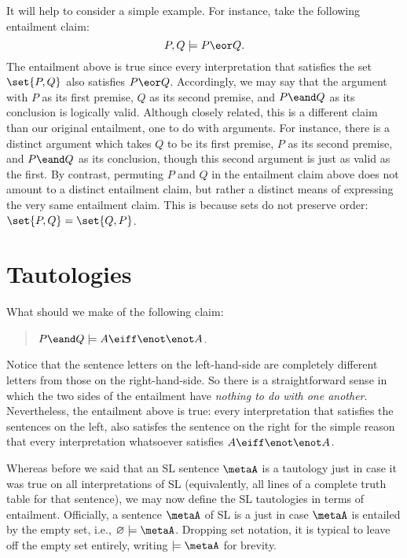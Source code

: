 It will help to consider a simple example.
For instance, take the following entailment claim: 
  $$P, Q \models P\eor Q.$$ 
The entailment above is true since every interpretation that satisfies the set $\set{P, Q}$ also satisfies $P\eor Q$.
Accordingly, we may say that the argument with $P$ as its first premise, $Q$ as its second premise, and $P\eand Q$ as its conclusion is logically valid. 
Although closely related, this is a different claim than our original entailment, one to do with arguments.
For instance, there is a distinct argument which takes $Q$ to be its first premise, $P$ as its second premise, and $P\eand Q$ as its conclusion, though this second argument is just as valid as the first.
By contrast, permuting $P$ and $Q$ in the entailment claim above does not amount to a distinct entailment claim, but rather a distinct means of expressing the very same entailment claim. 
This is because sets do not preserve order: $\set{P,Q}=\set{Q,P}$.




\section{Tautologies}

What should we make of the following claim:

\begin{quote}
  $P\eand Q \models A\eiff\enot\enot A$.
\end{quote}

Notice that the sentence letters on the left-hand-side are completely different letters from those on the right-hand-side.
So there is a straightforward sense in which the two sides of the entailment have \emph{nothing to do with one another}.
Nevertheless, the entailment above is true: every interpretation that satisfies the sentences on the left, also satisfes the sentence on the right for the simple reason that every interpretation whatsoever satisfies $A\eiff\enot\enot A$.

Whereas before we said that an SL sentence $\metaA$ is a tautology just in case it was true on all interpretations of SL (equivalently, all lines of a complete truth table for that sentence), we may now define the SL tautologies in terms of entailment.
Officially, a sentence $\metaA$ of SL is a  just in case $\metaA$ is entailed by the empty set, i.e., $\varnothing \models \metaA$.
Dropping set notation, it is typical to leave off the empty set entirely, writing $\models \metaA$ for brevity.

